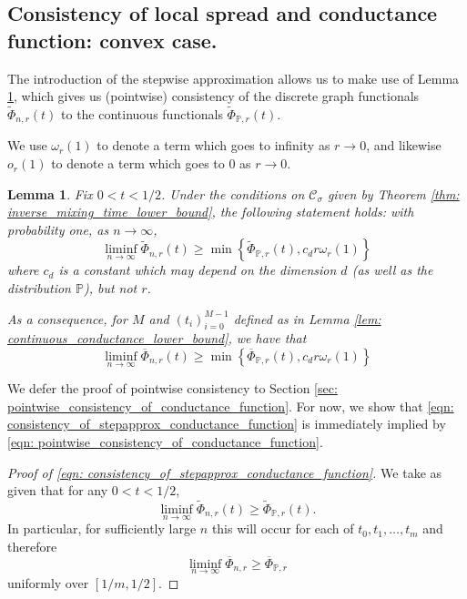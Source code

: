 \documentclass{article}
\newcommand{\1}{\mathbf{1}}
\newcommand{\Pbb}{\mathbb{P}}
\newcommand{\Cset}{\mathcal{C}}
\newcommand{\Csig}{\Cset_{\sigma}}
\theoremstyle{aldenthm}
\newtheorem{lemma}{Lemma}
\begin{document}
\subsection{Consistency of local spread and conductance function: convex case.}
\label{sec: convex_consistency}

The introduction of the stepwise approximation allows us to make use of Lemma \ref{lem: consistency_of_conductance_function}, which gives us (pointwise) consistency of the discrete graph functionals $\widetilde{\Phi}_{n,r}(t)$ to the continuous functionals $\widetilde{\Phi}_{\Pbb,r}(t)$.

We use $\omega_r(1)$ to denote a term which goes to infinity as $r \to 0$, and likewise $o_r(1)$ to denote a term which goes to $0$ as $r \to 0$. 

\begin{lemma}
	\label{lem: consistency_of_conductance_function}
	Fix $0 < t < 1/2$. Under the conditions on $\Csig$ given by Theorem \ref{thm: inverse_mixing_time_lower_bound}, the following statement holds: with probability one, as $n \to \infty$,
	\begin{equation}
	\label{eqn: pointwise_consistency_of_conductance_function}
	\liminf_{n \to \infty} \widetilde{\Phi}_{n,r}(t) \geq \min\left\{\widetilde{\Phi}_{\Pbb,r}(t), c_d r \omega_r(1)\right\}
	\end{equation}
	where $c_d$ is a constant which may depend on the dimension $d$ (as well as the distribution $\Pbb$), but not $r$.
	
	As a consequence, for $M$ and $(t_i)_{i=0}^{M-1}$ defined as in Lemma \ref{lem: continuous_conductance_lower_bound}, we have that
	\begin{equation}
	\label{eqn: consistency_of_stepapprox_conductance_function}
	\liminf_{n \to \infty} \overline{\Phi}_{n,r}(t) \geq \min\left\{\overline{\Phi}_{\Pbb,r}(t), c_d r \omega_r(1)\right\}
	\end{equation}
\end{lemma}
We defer the proof of pointwise consistency to Section \ref{sec: pointwise_consistency_of_conductance_function}. For now, we show that \eqref{eqn: consistency_of_stepapprox_conductance_function} is immediately implied by \eqref{eqn: pointwise_consistency_of_conductance_function}.

\begin{proof}[Proof of \eqref{eqn: consistency_of_stepapprox_conductance_function}]
	We take as given that for any $0 < t < 1/2$,
	\begin{equation*}
	\liminf_{n \to \infty} \widetilde{\Phi}_{n,r}(t) \geq \widetilde{\Phi}_{\Pbb,r}(t).
	\end{equation*}
	In particular, for sufficiently large $n$ this will occur for each of $t_0, t_1, \ldots, t_m$ and therefore
	\begin{equation*}
	\liminf_{n \to \infty} \overline{\Phi}_{n,r} \geq \overline{\Phi}_{\Pbb,r}
	\end{equation*}
	uniformly over $[1/m,1/2]$.
\end{proof}
\end{document}
